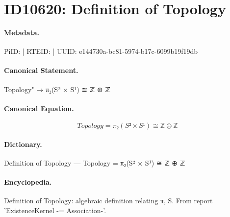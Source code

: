 \section*{ID10620: Definition of Topology}
\paragraph{Metadata.}
PiID:  | RTEID:  | UUID: e144730a-bc81-5974-b17c-6099b19f19db

\paragraph{Canonical Statement.}
Topology" → π₂(S² × S¹) ≅ ℤ ⊕ ℤ

\paragraph{Canonical Equation.}
\[
Topology = π₂(S² × S¹) ≅ ℤ ⊕ ℤ
\]

\paragraph{Dictionary.}
Definition of Topology — Topology = π₂(S² × S¹) ≅ ℤ ⊕ ℤ

\paragraph{Encyclopedia.}
Definition of Topology: algebraic definition relating π, S. From report 'ExistenceKernel -= Association-'.
